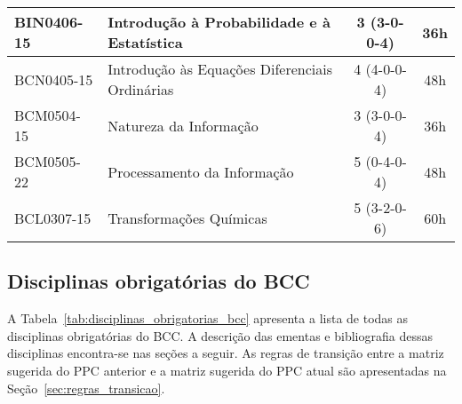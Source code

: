 \begin{table}[h!]
\begin{tabular}{|l|p{}|c|c|}
        BIN0406-15 & Introdução à Probabilidade e à Estatística & 3 (3-0-0-4) & 36h\\
        \hline
        BCN0405-15 & Introdução às Equações Diferenciais Ordinárias & 4 (4-0-0-4) & 48h \\
        \hline
        BCM0504-15 & Natureza da Informação & 3 (3-0-0-4) & 36h\\
        \hline
        BCM0505-22 & Processamento da Informação & 5 (0-4-0-4) & 48h\\
        \hline
        BCL0307-15 & Transformações Químicas & 5 (3-2-0-6) & 60h\\
        \hline
    \end{tabular}
\end{table}


\subsection{Disciplinas obrigatórias do BCC}
\label{sec:disciplinas_obrigatorais_ementas}

A Tabela~\ref{tab:disciplinas_obrigatorias_bcc} apresenta a lista de todas as
disciplinas obrigatórias do BCC.
A descrição das ementas e bibliografia dessas disciplinas encontra-se nas
seções a seguir.
As regras de transição entre a matriz sugerida do PPC anterior e a matriz
sugerida do PPC atual são apresentadas na Seção~\ref{sec:regras_transicao}.


